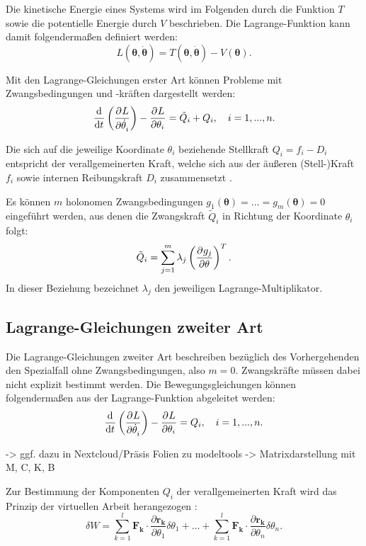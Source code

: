 Die kinetische Energie eines Systems wird im Folgenden durch die Funktion $T$ sowie die potentielle Energie durch $V$ beschrieben. Die Lagrange-Funktion kann damit folgendermaßen definiert werden:
\begin{equation}
	L(\mathbf{\theta}, \dot{\mathbf{\theta}}) = T(\mathbf{\theta}, \dot{\mathbf{\theta}}) - V(\mathbf{\theta}).
\end{equation}

Mit den Lagrange-Gleichungen erster Art können Probleme mit Zwangsbedingungen und -kräften dargestellt werden:
\begin{equation}
	\frac{\mathrm{d}^{}}{\mathrm{d}{t}^{}}\left(\frac{\partial^{}L}{\partial{\dot{\theta}_i}^{}} \right) - \frac{\partial^{}L}{\partial{\theta_i}^{}} = \tilde{Q}_i + Q_i, \quad i = 1, ..., n.
\end{equation}

Die sich auf die jeweilige Koordinate $\theta_i$ beziehende Stellkraft $Q_i = f_i - D_i$ entspricht der verallgemeinerten Kraft, welche sich aus der äußeren (Stell-)Kraft $f_i$ sowie internen Reibungskraft $D_i$ zusammensetzt \cite[S. 49]{Lagrange}.

Es können $m$ holonomen Zwangsbedingungen $g_1(\mathbf{\theta}) = ... = g_m(\mathbf{\theta}) = 0$ eingeführt werden, aus denen die Zwangskraft $\tilde{Q}_i$ in Richtung der Koordinate $\theta_i$ folgt:
\begin{equation}
	\tilde{Q}_i = \sum_{j = 1}^m \lambda_j \left(\frac{\partial^{}g_j}{\partial{\mathbf{\theta}}^{}}\right)^T.
\end{equation}
In dieser Beziehung bezeichnet $\lambda_j$ den jeweiligen Lagrange-Multiplikator.

\subsection{Lagrange-Gleichungen zweiter Art}
\label{sec:Lagrange2_theory}
Die Lagrange-Gleichungen zweiter Art beschreiben bezüglich des Vorhergehenden den Spezialfall ohne Zwangsbedingungen, also $m = 0$. Zwangskräfte müssen dabei nicht explizit bestimmt werden. Die Bewegungsgleichungen können folgendermaßen aus der Lagrange-Funktion abgeleitet werden:
\begin{equation}
	\frac{\mathrm{d}^{}}{\mathrm{d}{t}^{}}\left(\frac{\partial^{}L}{\partial{\dot{\theta}_i}^{}} \right) - \frac{\partial^{}L}{\partial{\theta_i}^{}} = Q_i, \quad i = 1, ..., n.
\end{equation} 

-> ggf. dazu in Nextcloud/Präsis Folien zu modeltools -> Matrixdarstellung mit M, C, K, B

Zur Bestimmung der Komponenten $Q_i$ der verallgemeinerten Kraft wird das Prinzip der virtuellen Arbeit herangezogen \cite{VirtualWork}:
\begin{equation}
	\delta W = \sum_{k=1}^l \mathbf{F_k} \cdot \frac{\partial \mathbf{r_k}}{\partial \theta_1} \delta \theta_1 +\ldots + \sum_{k=1}^l \mathbf{F_k} \cdot \frac{\partial \mathbf{r_k}}{\partial \theta_n} \delta \theta_n.
\end{equation}

